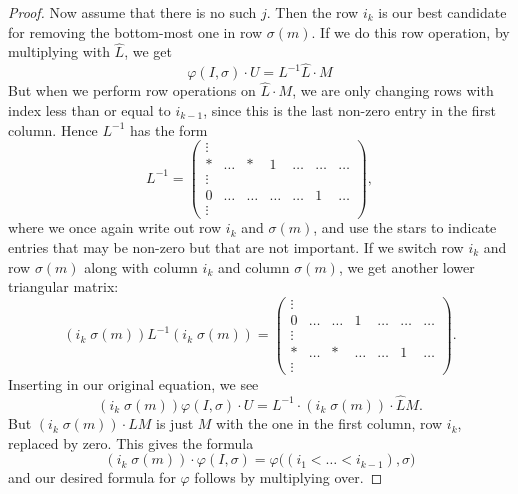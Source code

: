 \begin{proof}
  Now assume that there is no such $j$. Then the row $i_k$ is our best
  candidate for removing the bottom-most one in row $\sigma(m)$. If we
  do this row operation, by multiplying with $\widehat L$, we get
  \[ \varphi(I,\sigma)\cdot U = L^{-1}\widehat{L} \cdot M \]
  But when we perform row operations on $\widehat{L} \cdot M$, we are
  only changing rows with index less than or equal to $i_{k-1}$, since
  this is the last non-zero entry in the first column. Hence $L^{-1}$
  has the form
  \[ L^{-1} = 
  \begin{pmatrix}
    \vdots \\
    * & \dots & * & 1 & \dots & \dots & \dots \\
    \vdots \\
    0 & \dots & \dots & \dots & \dots & 1 & \dots \\
    \vdots
  \end{pmatrix},
  \]
  where we once again write out row $i_k$ and $\sigma(m)$, and use the
  stars to indicate entries that may be non-zero but that are not
  important.
  If we switch row $i_k$ and row $\sigma(m)$ along with column
  $i_k$ and column $\sigma(m)$, we get another lower triangular
  matrix:
  \[ (i_k \; \sigma(m)) L^{-1} (i_k \; \sigma(m)) = 
  \begin{pmatrix}
    \vdots \\
    0 & \dots & \dots & 1 & \dots & \dots & \dots \\
    \vdots \\
    * & \dots & * & \dots & \dots & 1 & \dots \\
    \vdots
  \end{pmatrix}.\]
  Inserting in our original equation, we see
  \[ (i_k \; \sigma(m)) \varphi(I,\sigma) \cdot U = L^{-1} \cdot (i_k \;
  \sigma(m)) \cdot \widehat{L} M. \]
  But $(i_k \; \sigma(m)) \cdot \widehat{L} M$ is just $M$ with the
  one in the first column, row $i_k$, replaced by zero. This gives the
  formula
  \[ (i_k \; \sigma(m)) \cdot \varphi(I,\sigma) =
  \varphi\big((i_1<\dots<i_{k-1}),\sigma\big) \]
  and our desired formula for $\varphi$ follows by multiplying over.
\end{proof}

